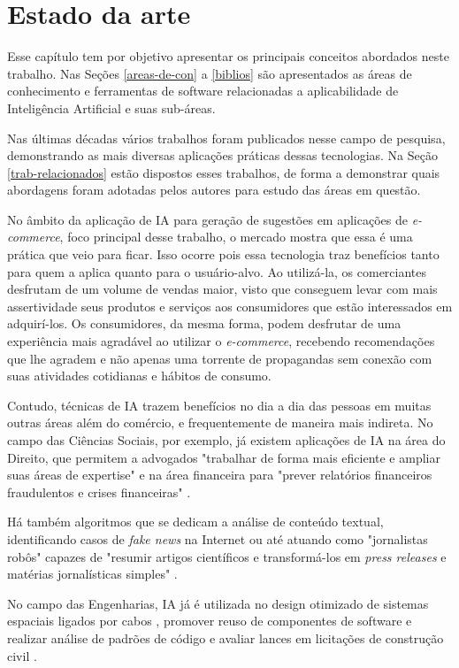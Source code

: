 \chapter{Estado da arte}
\pagestyle{simple} 

Esse capítulo tem por objetivo apresentar os principais conceitos abordados neste trabalho. Nas Seções \ref{areas-de-con} a \ref{biblios} são apresentados as áreas de conhecimento e ferramentas de software relacionadas a aplicabilidade de Inteligência Artificial e suas sub-áreas.

Nas últimas décadas vários trabalhos foram publicados nesse campo de pesquisa, demonstrando as mais diversas aplicações práticas dessas tecnologias. Na Seção \ref{trab-relacionados} estão dispostos esses trabalhos, de forma a demonstrar quais abordagens foram adotadas pelos autores para estudo das áreas em questão.

No âmbito da aplicação de IA para geração de sugestões em aplicações de \textit{e-commerce}, foco principal desse trabalho, o mercado mostra que essa é uma prática que veio para ficar. Isso ocorre pois essa tecnologia traz benefícios tanto para quem a aplica quanto para o usuário-alvo. Ao utilizá-la, os comerciantes desfrutam de um volume de vendas maior, visto que conseguem levar com mais assertividade seus produtos e serviços aos consumidores que estão interessados em adquirí-los. Os consumidores, da mesma forma, podem desfrutar de uma experiência mais agradável ao utilizar o \textit{e-commerce}, recebendo recomendações que lhe agradem e não apenas uma torrente de propagandas sem conexão com suas atividades cotidianas e hábitos de consumo.

Contudo, técnicas de IA trazem benefícios no dia a dia das pessoas em muitas outras áreas além do comércio, e frequentemente de maneira mais indireta. No campo das Ciências Sociais, por exemplo, já existem aplicações de IA na área do Direito, que permitem a advogados "trabalhar de forma mais eficiente e ampliar suas áreas de expertise"  e na área financeira para "prever relatórios financeiros fraudulentos e crises financeiras" .

Há também algoritmos que se dedicam a análise de conteúdo textual, identificando casos de \textit{fake news} na Internet \cite{chitturi20} ou até atuando como "jornalistas robôs" capazes de "resumir artigos científicos e transformá-los em \textit{press releases} e matérias jornalísticas simples" .

No campo das Engenharias, IA já é utilizada no design otimizado de sistemas espaciais ligados por cabos \cite{chen19}, promover reuso de componentes de software e realizar análise de padrões de código \cite{wangoo18} e avaliar lances em licitações de construção civil \cite{sun11}.

